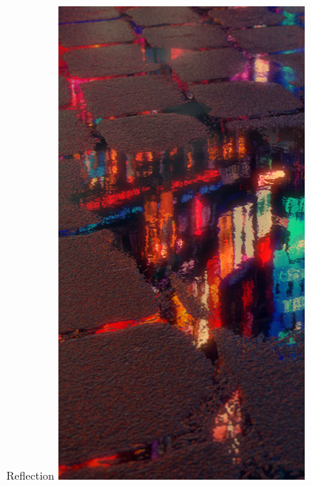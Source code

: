 \documentclass{lug}
\begin{document}
\begin{frame}{Reflection}
{    }{
        \includegraphics[width=\textwidth]{graphics/puddle-reflection}
    }
\end{frame}
\end{document}
